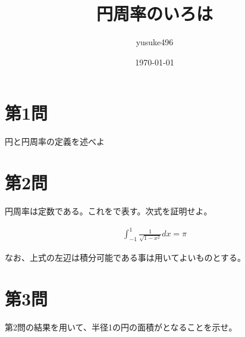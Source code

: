 \documentclass[11pt,a4paper]{jsarticle}
\title{円周率のいろは}
\author{yusuke496}
\date{\today}
\begin{document}
\maketitle

\section*{第1問}
円と円周率の定義を述べよ

\section*{第2問}
円周率は定数である。これを\pi で表す。次式を証明せよ。

\begin{eqnarray}
\int_{-1}^{1}\frac{1}{\sqrt{1-x^2}}dx=\pi \nonumber
\end{eqnarray}

なお、上式の左辺は積分可能である事は用いてよいものとする。

\section*{第3問}
第2問の結果を用いて、半径1の円の面積が\pi となることを示せ。
  
\end{document}
